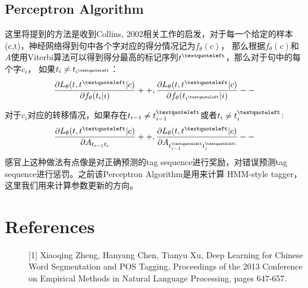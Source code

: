 \documentclass[UTF8]{ctexart}
\begin{document}
\subsection{Perceptron Algorithm}
这里将提到的方法是收到Collins, 2002相关工作的启发，对于每一个给定的样本(c,t)，神经网络得到句中各个字对应的得分情况记为$f_{\theta}(c)$，
那么根据$f_{\theta}(c)$和$A$使用Viterbi算法可以得到得分最高的标记序列$t^{\textquoteleft}$，那么对于句中的每个字$c_i$，
如果$t_i \neq t_{i^{\textquoteleft}}$：
\begin{equation}
\frac{\partial L_{\theta} (t, t^{\textquoteleft} | c)}{\partial f_{\theta}(t_i|i)}++, 
\frac{\partial L_{\theta} (t, t^{\textquoteleft} | c)}{\partial f_{\theta}(t_{i^{\textquoteleft}}|i)}--
\end{equation}

对于$c_i$对应的转移情况，如果存在$t_{i-1} \neq t_{i-1}^{\textquoteleft}$或者$t_i \neq t_{i}^{\textquoteleft}$:
\begin{equation}
\frac{\partial L_{\theta} (t, t^{\textquoteleft} | c)}{\partial A_{t_{i-1}t_i}}++, 
\frac{\partial L_{\theta} (t, t^{\textquoteleft} | c)}{\partial A_{t_{i-1}^{\textquoteleft}t_{i}^{\textquoteleft}}}--
\end{equation}
感官上这种做法有点像是对正确预测的tag sequence进行奖励，对错误预测tag sequence进行惩罚。之前该Perceptron Algorithm是用来计算
HMM-style tagger，这里我们用来计算参数更新的方向。

\section{References}
\begin{description}
\item[][1] Xiaoqing Zheng, Hanyang Chen, Tianyu Xu, Deep Learning for Chinese Word Segmentation and POS Tagging,
Proceedings of the 2013 Conference on Empirical Methods in Natural Language Processing, pages 647-657.

\end{description}
\end{document}
